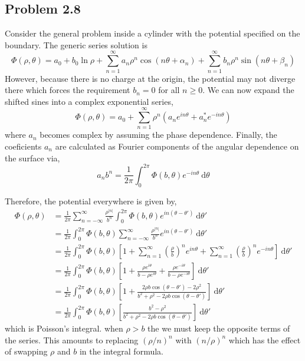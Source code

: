\documentclass[12pt]{extarticle}
\renewcommand{\d}[1]{\: \mathrm{d}#1}
\theoremstyle{definition}
\begin{document}
\subsection{Problem 2.8}

Consider the general problem inside a cylinder with the potential specified on the boundary. The generic series solution is
\[ \Phi(\rho, \theta) = a_0 + b_0 \ln{\rho} + \sum_{n = 1}^\infty a_n \rho^n \cos{(n \theta + \alpha_n)} + \sum_{n = 1}^{\infty} b_n \rho^{n} \sin{(n \theta + \beta_n)} \]
However, because there is no charge at the origin, the potential may not diverge there which forces the requirement $b_n = 0$ for all $n \ge 0$. We can now expand the shifted sines into a complex exponential series,
\[ \Phi(\rho, \theta) = a_0 + \sum_{n = 1}^\infty \rho^n \left(a_n e^{i n \theta} + a_n^* e^{-i n \theta} \right) \]
where $a_n$ becomes complex by assuming the phase dependence. 
Finally, the coeficients $a_n$ are calculated as Fourier components of the angular dependence on the surface via,
\[ 
a_n b^n = \frac{1}{2\pi} \int_0^{2 \pi} \Phi(b, \theta) e^{-i n \theta} \d{\theta} \]

Therefore, the potential everywhere is given by,
\begin{align*}
\Phi(\rho, \theta) & = \frac{1}{2\pi} \sum_{n = -\infty}^{\infty} \frac{\rho^{|n|}}{b^n} \int_0^{2 \pi} \Phi(b, \theta) e^{i n (\theta - \theta')} \d{\theta'} 
\\
& = \frac{1}{2\pi} \int_0^{2 \pi} \Phi(b, \theta) \sum_{n = -\infty}^{\infty} \frac{\rho^{|n|}}{b^n}e^{i n (\theta - \theta')} \d{\theta'} 
\\
& = \frac{1}{2\pi} \int_0^{2 \pi} \Phi(b, \theta) \left[ 1 + \sum_{n = 1}^\infty \left( \frac{\rho}{b} \right)^n e^{i n \theta} + \sum_{n = 1}^\infty \left( \frac{\rho}{b} \right)^n e^{-i n \theta}  \right] \d{\theta'} 
\\
& = \frac{1}{2\pi} \int_0^{2 \pi} \Phi(b, \theta) \left[ 1 + \frac{\rho e^{i \theta}}{b - \rho e^{i \theta}} + \frac{\rho e^{-i \theta}}{b - \rho e^{-i \theta}}  \right] \d{\theta'} 
\\
& = \frac{1}{2\pi} \int_0^{2 \pi} \Phi(b, \theta) \left[ 1 + \frac{2\rho b \cos{(\theta - \theta')} - 2 \rho^2}{b^2 + \rho^2 - 2 \rho b \cos{(\theta - \theta')}}  \right] \d{\theta'} 
\\
& = \frac{1}{2\pi} \int_0^{2 \pi} \Phi(b, \theta) \left[ \frac{b^2 - \rho^2}{b^2 + \rho^2 - 2 \rho b \cos{(\theta - \theta')}}  \right] \d{\theta'} 
\end{align*}
which is Poisson's integral. when $\rho > b$ the we must keep the opposite terms of the series. This amounts to replacing $(\rho/n)^n$ with $(n / \rho)^n$ which has the effect of swapping $\rho$ and $b$ in the integral formula. 
\end{document}
